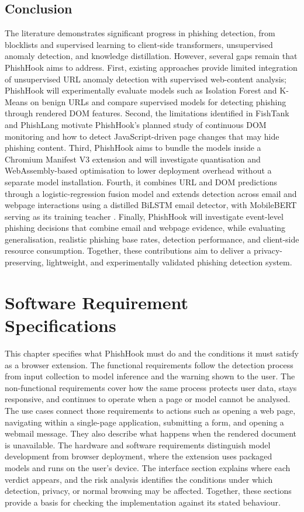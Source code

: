 \documentclass{FastFyp}
\begin{document}
\section{Conclusion}
\label{sec:litreview-conclusion}
The literature demonstrates significant progress in phishing detection, from blocklists and supervised learning to client-side transformers, unsupervised anomaly detection, and knowledge distillation. However, several gaps remain that PhishHook aims to address. First, existing approaches provide limited integration of unsupervised URL anomaly detection with supervised web-content analysis; PhishHook will experimentally evaluate models such as Isolation Forest and K-Means on benign URLs and compare supervised models for detecting phishing through rendered DOM features. Second, the limitations identified in FishTank and PhishLang \cite{phishlang2026} motivate PhishHook's planned study of continuous DOM monitoring and how to detect JavaScript-driven page changes that may hide phishing content. Third, PhishHook aims to bundle the models inside a Chromium Manifest V3 extension and will investigate quantisation and WebAssembly-based optimisation to lower deployment overhead without a separate model installation. Fourth, it combines URL and DOM predictions through a logistic-regression fusion model and extends detection across email and webpage interactions using a distilled BiLSTM email detector, with MobileBERT serving as its training teacher \cite{distilbilstm2026}. Finally, PhishHook will investigate event-level phishing decisions that combine email and webpage evidence, while evaluating generalisation, realistic phishing base rates, detection performance, and client-side resource consumption. Together, these contributions aim to deliver a privacy-preserving, lightweight, and experimentally validated phishing detection system.

\chapter{Software Requirement Specifications}
\label{ch:srs}
This chapter specifies what PhishHook must do and the conditions it must satisfy as a browser extension. The functional requirements follow the detection process from input collection to model inference and the warning shown to the user. The non-functional requirements cover how the same process protects user data, stays responsive, and continues to operate when a page or model cannot be analysed. The use cases connect those requirements to actions such as opening a web page, navigating within a single-page application, submitting a form, and opening a webmail message. They also describe what happens when the rendered document is unavailable. The hardware and software requirements distinguish model development from browser deployment, where the extension uses packaged models and runs on the user's device. The interface section explains where each verdict appears, and the risk analysis identifies the conditions under which detection, privacy, or normal browsing may be affected. Together, these sections provide a basis for checking the implementation against its stated behaviour.
\end{document}
